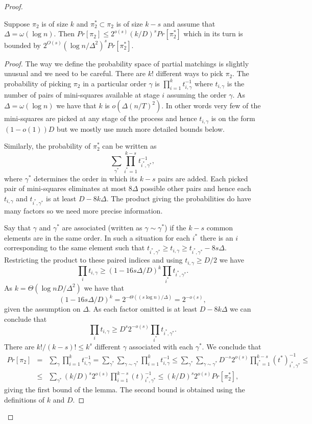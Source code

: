\documentclass{article}\usepackage[a4paper,margin=20mm]{geometry}
\begin{document}
\begin{proof}
\begin{lemma}\label{lemma:pi2}
Suppose $\pi_2$ is of size $k$ and $\pi_2^* \subset \pi_2$
is of size $k-s$ and assume that $\Delta= \omega (\log n)$.
Then $Pr [\pi_2] \leq 2^{o(s)}(k/D)^s Pr[\pi_2^*]$
which in its turn is bounded by $2^{O(s)}(\log n/\Delta^2)^s Pr[\pi_2^*]$.
\end{lemma}

\begin{proof}
The way we define the probability space of partial matchings
is slightly unusual and we need to be careful.
There are $k!$ different ways to pick $\pi_2$.
The probability of picking $\pi_2$ in a particular
order $\gamma$ is $\prod_{i=1}^k t_{i,\gamma}^{-1}$ where $t_{i,\gamma}$ 
is the number of pairs of mini-squares available at stage $i$
assuming the order $\gamma$.  As $\Delta = \omega (\log n)$
we have that $k$ is $o( \Delta (n/T)^2)$.  In other words very few of the
mini-squares are picked at any stage of the process
and hence $t_{i,\gamma}$ is on the
form $(1-o(1))D$ but we mostly use much more detailed bounds below.

Similarly, the probability of $\pi_2^*$ can be written as
$$
\sum_{\gamma^*} \prod_{i^*=1}^{k-s} t_{i^*, \gamma^*}^{-1},
$$
where $\gamma^*$ determines the order in which its $k-s$
pairs are added.  
Each picked pair of mini-squares eliminates at most $8 \Delta$ possible
other pairs and hence each $t_{i,\gamma}$ and $t_{i^*,\gamma^*}$ is
at least  $D-8k\Delta$.
The product giving the probabilities do have
many factors so we need more precise information.

Say that $\gamma$ and $\gamma^*$ are associated (written
as $\gamma \sim \gamma^*$) if the $k-s$ common elements
are in the same order.  In such
a situation for each $i^*$ there is an $i$ corresponding
to the same element such that $t_{i^*,\gamma^*} \geq t_{i,\gamma}
 \geq t_{i^*, \gamma^*} -8s\Delta$.
Restricting the product to these paired
indices and using $t_{i,\gamma} \geq D/2$ we have
$$
\prod_{i} t_{i,\gamma} \geq (1-16s \Delta /D)^k \prod_{i^*} t_{i^*,\gamma^*}.
$$
As $k = \Theta( \log n D /\Delta^2)$ we have that
$$(1-16s \Delta /D)^k = 2^{-\Theta ( (s\log n)/\Delta)} = 2^{-o(s)},$$
given the assumption on $\Delta$.
As each factor omitted is at least $D-8k \Delta$ we 
can conclude that 
$$
\prod_{i} t_{i,\gamma} \geq D^s 2^{-o(s)} \prod_{i^*} t_{i^*,\gamma^*}.
$$
There are $k! /(k-s)! \leq k^s $  different $\gamma$ associated
with each $\gamma^*$.  We conclude that
\begin{eqnarray*}
Pr[\pi_2] & =& \sum_{\gamma} \prod_{i=1}^k t_{i,\gamma}^{-1}
= \sum_{\gamma^*} \sum_{\gamma \sim \gamma^*}
\prod_{i=1}^k t_{i,\gamma}^{-1} \leq 
\sum_{\gamma^*} \sum_{\gamma \sim \gamma^*}
D^{-s}  2^{o(s)} \prod_{i^*=1}^{k-s} (t^*)_{i^*,\gamma^*}^{-1} \leq \\
&\leq & \sum_{\gamma^*} 
(k/D)^{s}  2^{o(s)}
\prod_{i=1}^{k-s} (t)_{i^*,\gamma^*}^{-1} \leq 
(k/D)^{s}  2^{o(s)} Pr[\pi_2^*],
\end{eqnarray*}
giving the first bound of the lemma.  The second bound is obtained
using the definitions of $k$ and $D$.
\end{proof}


\end{proof}
\end{document}
